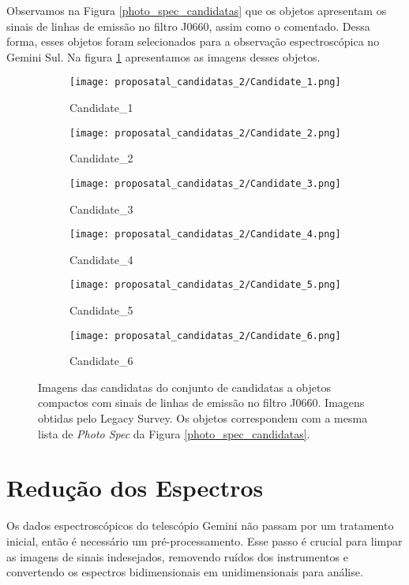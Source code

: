 Observamos na Figura \ref{photo_spec_candidatas} que os objetos apresentam os sinais de linhas de emissão no filtro J0660, assim como o comentado. Dessa forma, esses objetos foram selecionados para a observação espectroscópica no Gemini Sul. Na figura \ref{candidatas_espectroscopia_2_img} apresentamos as imagens desses objetos.

\begin{figure}[!ht]
    \centering
    \captionsetup{justification=centering}
    \begin{subfigure}[b]{0.25\textwidth}
        \texttt{[image: proposatal\_candidatas\_2/Candidate\_1.png]}
        \caption{Candidate\_1}
    \end{subfigure}
    \begin{subfigure}[b]{0.25\textwidth}
        \texttt{[image: proposatal\_candidatas\_2/Candidate\_2.png]}
        \caption{Candidate\_2}
    \end{subfigure}
    \begin{subfigure}[b]{0.25\textwidth}
        \texttt{[image: proposatal\_candidatas\_2/Candidate\_3.png]}
        \caption{Candidate\_3}
    \end{subfigure}
    \begin{subfigure}[b]{0.25\textwidth}
        \texttt{[image: proposatal\_candidatas\_2/Candidate\_4.png]}
        \caption{Candidate\_4}
    \end{subfigure}
    \begin{subfigure}[b]{0.25\textwidth}
        \texttt{[image: proposatal\_candidatas\_2/Candidate\_5.png]}
        \caption{Candidate\_5}
    \end{subfigure}
    \begin{subfigure}[b]{0.25\textwidth}
        \texttt{[image: proposatal\_candidatas\_2/Candidate\_6.png]}
        \caption{Candidate\_6}
    \end{subfigure}
    \caption{Imagens das candidatas do conjunto de candidatas a objetos compactos com sinais de linhas de emissão no filtro J0660. Imagens obtidas pelo Legacy Survey. Os objetos correspondem com a mesma lista de \textit{Photo Spec} da Figura \ref{photo_spec_candidatas}.}
    \label{candidatas_espectroscopia_2_img}
\end{figure}

\section{Redução dos Espectros}
Os dados espectroscópicos do telescópio Gemini não passam por um tratamento inicial, então é necessário um pré-processamento. Esse passo é crucial para limpar as imagens de sinais indesejados, removendo ruídos dos instrumentos e convertendo os espectros bidimensionais em unidimensionais para análise.

